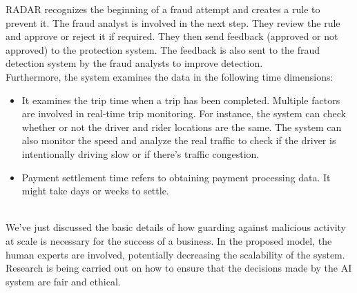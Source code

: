 RADAR recognizes the beginning of a fraud attempt and creates a rule to prevent it. The fraud analyst is involved in the next step. They review the rule and approve or reject it if required. They then send feedback (approved or not approved) to the protection system. The feedback is also sent to the fraud detection system by the fraud analysts to improve detection.
\\
Furthermore, the system examines the data in the following time dimensions:

\begin{itemize}
\item
\protect{}\label{dfiuR4-Zny90GPdw8LMLI}
It examines the trip time when a trip has been completed. Multiple factors are involved in real-time trip monitoring. For instance, the system can check whether or not the driver and rider locations are the same. The system can also monitor the speed and analyze the real traffic to check if the driver is intentionally driving slow or if there's traffic congestion.
\item
\protect{}\label{DTjhI57WhqtnfGw8AOASF}
Payment settlement time refers to obtaining payment processing data. It might take days or weeks to settle.
\end{itemize}
\\
We've just discussed the basic details of how guarding against malicious activity at scale is necessary for the success of a business. In the proposed model, the human experts are involved, potentially decreasing the scalability of the system. Research is being carried out on how to ensure that the decisions made by the AI system are fair and ethical.

